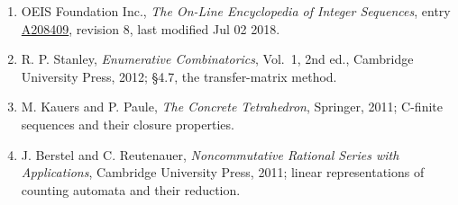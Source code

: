 \documentclass[11pt]{article}
\theoremstyle{definition}
\begin{document}
\begin{enumerate}

\item OEIS Foundation Inc., \emph{The On-Line Encyclopedia of Integer Sequences}, entry \href{https://oeis.org/A208409}{A208409}, revision 8, last modified Jul 02 2018.

\item R. P. Stanley, \emph{Enumerative Combinatorics}, Vol.~1, 2nd ed., Cambridge University Press, 2012; \S4.7, the transfer-matrix method.

\item M. Kauers and P. Paule, \emph{The Concrete Tetrahedron}, Springer, 2011; C-finite sequences and their closure properties.

\item J. Berstel and C. Reutenauer, \emph{Noncommutative Rational Series with Applications}, Cambridge University Press, 2011; linear representations of counting automata and their reduction.

\end{enumerate}
\end{document}
